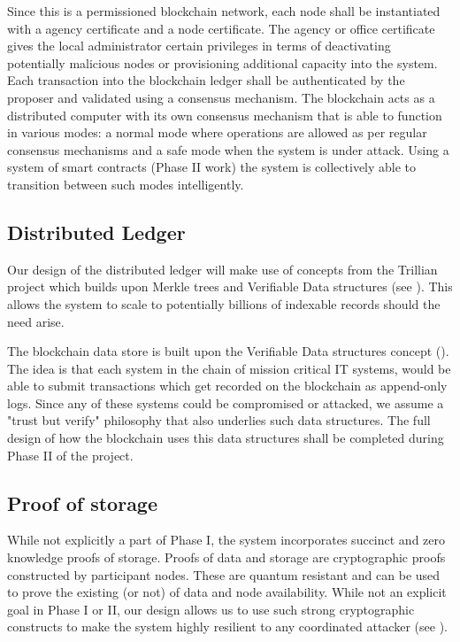 Since this is a permissioned blockchain network, each node shall be instantiated with a agency certificate and a node
certificate. The agency or office certificate gives the local administrator certain privileges in terms of deactivating
potentially malicious nodes or provisioning additional capacity into the system. Each transaction into the blockchain
ledger shall be authenticated by the proposer and validated using a consensus mechanism. The blockchain acts as a
distributed computer with its own consensus mechanism that is able to function in various modes: a normal mode where
operations are allowed as per regular consensus mechanisms and a safe mode when the system is under attack. Using a
system of smart contracts (Phase II work) the system is collectively able to transition between such modes intelligently.

\subsection{Distributed Ledger}

Our design of the distributed ledger will make use of concepts from the Trillian project which builds upon Merkle trees
and Verifiable Data structures (see \cite{verifiable2015}). This allows the system to scale to potentially billions of
indexable records should the need arise.

The blockchain data store is built upon the Verifiable Data structures concept (\cite{verifiable2015}). The idea is that each
system in the chain of mission critical IT systems, would be able to submit transactions which get recorded on the
blockchain as append-only logs. Since any of these systems could be compromised or attacked, we assume a "trust but
verify" philosophy that also underlies such data structures. The full design of how the blockchain uses this data
structures shall be completed during Phase II of the project.

\subsection{Proof of storage}

While not explicitly a part of Phase I, the system incorporates succinct and zero knowledge proofs of storage. Proofs
of data and storage are cryptographic proofs constructed by participant nodes. These are quantum resistant and can be
used to prove the existing (or not) of data and node availability. While not an explicit goal in Phase I or II, our
design allows us to use such strong cryptographic constructs to make the system highly resilient to any coordinated
attacker (see \cite{ben2019}).

